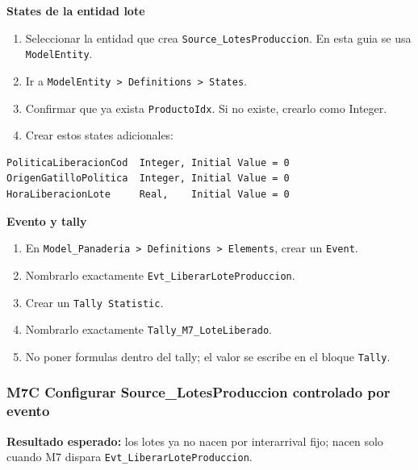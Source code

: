 \documentclass[11pt]{article}
\newcommand{\simio}[1]{\texttt{#1}}
\newcommand{\state}[1]{\texttt{#1}}
\begin{document}
\textbf{States de la entidad lote}
\begin{enumerate}
  \item Seleccionar la entidad que crea \simio{Source\_LotesProduccion}. En esta guia se usa \simio{ModelEntity}.
  \item Ir a \simio{ModelEntity > Definitions > States}.
  \item Confirmar que ya exista \state{ProductoIdx}. Si no existe, crearlo como Integer.
  \item Crear estos states adicionales:
\end{enumerate}

\begin{lstlisting}[caption={States de ModelEntity para trazabilidad M7}]
PoliticaLiberacionCod  Integer, Initial Value = 0
OrigenGatilloPolitica  Integer, Initial Value = 0
HoraLiberacionLote     Real,    Initial Value = 0
\end{lstlisting}

\textbf{Evento y tally}
\begin{enumerate}
  \item En \simio{Model\_Panaderia > Definitions > Elements}, crear un \simio{Event}.
  \item Nombrarlo exactamente \simio{Evt\_LiberarLoteProduccion}.
  \item Crear un \simio{Tally Statistic}.
  \item Nombrarlo exactamente \simio{Tally\_M7\_LoteLiberado}.
  \item No poner formulas dentro del tally; el valor se escribe en el bloque \simio{Tally}.
\end{enumerate}

\subsubsection{M7C Configurar Source\_LotesProduccion controlado por evento}
\textbf{Resultado esperado:} los lotes ya no nacen por interarrival fijo; nacen solo cuando M7 dispara \simio{Evt\_LiberarLoteProduccion}.
\end{document}
